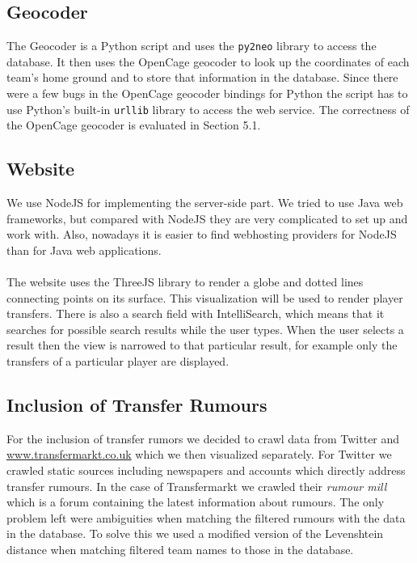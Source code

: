 \documentclass{article}
\begin{document}
\subsection{Geocoder}

The Geocoder is a Python script and uses the \verb+py2neo+ library to access the database. It then uses the OpenCage geocoder \cite{OpenCage} to look up the coordinates of each team's home ground and to store that information in the database. Since there were a few bugs in the OpenCage geocoder bindings for Python the script has to use Python's built-in \verb+urllib+ library to access the web service. The correctness of the OpenCage geocoder is evaluated in Section 5.1.

\subsection{Website}

We use NodeJS \cite{NodeJS} for implementing the server-side part. We tried to use Java web frameworks, but compared with NodeJS they are very complicated to set up and work with. Also, nowadays it is easier to find webhosting providers for NodeJS than for Java web applications.
\\ \\
The website uses the ThreeJS library \cite{ThreeJS} to render a globe and dotted lines connecting points on its surface. This visualization will be used to render player transfers. There is also a search field with IntelliSearch, which means that it searches for possible search results while the user types. When the user selects a result then the view is narrowed to that particular result, for example only the transfers of a particular player are displayed.

\subsection{Inclusion of Transfer Rumours}
For the inclusion of transfer rumors we decided to crawl data from Twitter and \url{www.transfermarkt.co.uk} which we then visualized separately. For Twitter we crawled static sources including newspapers and accounts which directly address transfer rumours. In the case of Transfermarkt we crawled their \emph{rumour mill} which is a forum containing the latest information about rumours. The only problem left were ambiguities when matching the filtered rumours with the data in the database. To solve this we used a modified version of the Levenshtein distance when matching filtered team names to those in the database. 
\end{document}
